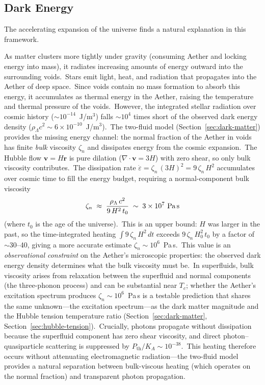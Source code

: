 ﻿\documentclass[12pt,letterpaper]{article}
\newcommand{\Ka}{K_{\!A}}
\begin{document}
\subsection{Dark Energy}
\label{sec:dark-energy}

The accelerating expansion of the universe finds a natural explanation in this framework.

As matter clusters more tightly under gravity (consuming Aether and locking energy into
mass), it radiates increasing amounts of energy outward into the surrounding voids.\ Stars
emit light, heat, and radiation that propagates into the Aether of deep space.\ Since voids
contain no mass formation to absorb this energy, it accumulates as thermal energy in the
Aether, raising the temperature and thermal pressure of the voids.\ However, the integrated stellar radiation over cosmic history
($\sim$$10^{-14}$~J/m$^3$) falls $\sim$$10^4$ times short of the observed dark
energy density ($\rho_\Lambda c^2 \sim 6 \times 10^{-10}$~J/m$^3$).\ The
two-fluid model (Section~\ref{sec:dark-matter}) provides the missing energy
channel: the normal fraction of the Aether in voids has finite \emph{bulk}
viscosity $\zeta_n$ and dissipates energy from the cosmic expansion.\ The
Hubble flow $\mathbf{v} = H\mathbf{r}$ is pure dilation ($\nabla \cdot
\mathbf{v} = 3H$) with zero shear, so only bulk viscosity contributes.\
The dissipation rate $\dot\varepsilon = \zeta_n\,(3H)^2 = 9\,\zeta_n\,H^2$
accumulates over cosmic time to fill the energy budget, requiring a
normal-component bulk viscosity
%
\begin{equation}
  \zeta_n \;\approx\; \frac{\rho_\Lambda\,c^2}{9\,H^2\,t_0}
    \;\sim\; 3 \times 10^{7}~\text{Pa\,s}
  \label{eq:zeta-normal}
\end{equation}
%
(where $t_0$ is the age of the universe).\ This is an upper bound: $H$ was
larger in the past, so the time-integrated heating $\int 9\,\zeta_n\,H^2\,dt$
exceeds $9\,\zeta_n\,H_0^2\,t_0$ by a factor of $\sim$30--40, giving a more
accurate estimate $\zeta_n \sim 10^6$~Pa\,s.\ This value is an
\emph{observational constraint} on the Aether's microscopic properties: the
observed dark energy density determines what the bulk viscosity must be.\
In superfluids, bulk viscosity arises from relaxation between the superfluid
and normal components (the three-phonon process) and can be substantial
near $T_c$; whether the Aether's excitation spectrum produces
$\zeta_n \sim 10^6$~Pa\,s is a testable prediction that shares the same
unknown---the excitation spectrum---as the dark matter magnitude and the
Hubble tension temperature ratio (Section~\ref{sec:dark-matter},
Section~\ref{sec:hubble-tension}).\ Crucially, photons propagate without dissipation because the superfluid
component has zero shear viscosity, and direct photon--quasiparticle
scattering is suppressed by $P_{\mathrm{th}}/\Ka \sim 10^{-38}$.\
This heating therefore occurs without attenuating electromagnetic
radiation---the two-fluid model provides a natural separation between
bulk-viscous heating (which operates on the normal fraction) and
transparent photon propagation.
\end{document}
